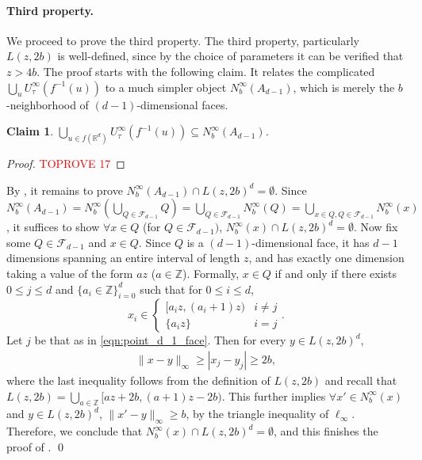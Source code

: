 \documentclass[11pt,letterpaper]{article}
\theoremstyle{plain}
\newtheorem{claim}[theorem]{Claim}
\theoremstyle{definition}
\theoremstyle{remark}
\def\ZZ{{\mathbb{Z}}}
\begin{document}
\paragraph{Third property.}
We proceed to prove the third property.
The third property, particularly $L(z, 2b)$ is well-defined, since by the choice of parameters it can be verified that $z > 4b$.
The proof starts with the following claim. It relates the complicated $\bigcup_{u} U_\tau^\infty(f^{-1}(u))$
to a much simpler object $N_b^\infty(A_{d - 1})$, which is merely the $b$-neighborhood of $(d - 1)$-dimensional faces.
\begin{claim}
    \label{claim:A_N} 
    $\bigcup_{u\in f(\mathbb{R}^{d})}U_{\tau}^{\infty}(f^{-1}(u))\subseteq N_{b}^{\infty}(A_{d-1})$. 
\end{claim}
\begin{proof}\textcolor{red}{TOPROVE 17}\end{proof}



By , it remains to prove $N_b^\infty(A_{d - 1}) \cap L(z, 2b)^d = \emptyset$.
Since $N_b^\infty(A_{d - 1}) = N_b^\infty(\bigcup_{Q \in \mathcal{F}_{d - 1}} Q)
= \bigcup_{Q \in \mathcal{F}_{d - 1}} N_b^\infty(Q) = \bigcup_{x \in Q, Q \in \mathcal{F}_{d - 1}}N_b^\infty(x)$,
it suffices to show $\forall x \in Q$ (for $ Q \in \mathcal{F}_{d - 1})$,
$N_b^\infty(x) \cap L(z, 2b)^d = \emptyset$.
Now fix some $Q \in \mathcal{F}_{d - 1}$ and $x \in Q$.
Since $Q$ is a $(d - 1)$-dimensional face, it has $d - 1$ dimensions spanning an entire interval of length $z$, and has exactly one dimension taking a value of the form $az$ ($a \in \ZZ$).
Formally, $x \in Q$ if and only if there exists
$0 \leq j \leq d$ and $\{a_i \in \ZZ\}_{i = 0}^d$ such that for $0 \leq i \leq d$,
\begin{equation}
    \label{eqn:point_d_1_face}
    x_i \in \begin{cases}
        [a_i z, (a_i + 1) z) & i \neq j \\
        \{ a_i z \} & i = j
    \end{cases}.
\end{equation}
Let $j$ be that as in \eqref{eqn:point_d_1_face}. Then for every $y \in L(z, 2b)^d$, 
\begin{align*}
    \|x - y\|_\infty
    \geq |x_j - y_j|
    \geq 2b,
\end{align*}
where the last inequality follows from the definition of $L(z, 2b)$ and recall that $L(z, 2b) = \bigcup_{a \in \ZZ} [az + 2b, (a + 1)z - 2b)$.
This further implies $\forall x' \in N_b^\infty(x)$ and $y \in L(z, 2b)^d$,
$\|x' - y\|_\infty \geq b$,
by the triangle inequality of $\ell_\infty$.
Therefore, we conclude that $N_b^\infty(x) \cap L(z, 2b)^d = \emptyset$,
and this finishes the proof of .
\qed
\end{document}
